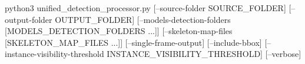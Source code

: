 \startBA
python3 unified_detection_processor.py 
    [--source-folder SOURCE_FOLDER]
    [--output-folder OUTPUT_FOLDER]
    [--models-detection-folders [MODELS_DETECTION_FOLDERS ...]]
    [--skeleton-map-files [SKELETON_MAP_FILES ...]]
    [--single-frame-output]
    [--include-bbox]
    [--instance-visibility-threshold INSTANCE_VISIBILITY_THRESHOLD]
    [--verbose]
\stopBA
\stopbuffer
